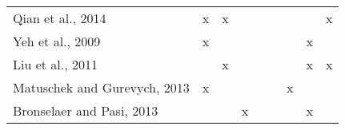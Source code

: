\begin{table}[]
\begin{tabular}{l|cccc|cccc}
Qian et al., 2014 \cite{2014.Tao.Qian.LexicalChainHypergraphWSI}                 & x                                  & x                                 &                                     &                                         &                                                                                  &                                        &                                                 & x                                                                                    \\
Yeh et al., 2009 \cite{2009.Yeh.Wikiwalk}                                        & x                                  &                                   &                                     &                                         &                                                                                  &                                        & x                                               &                                                                                      \\
Liu et al., 2011 \cite{2011.Haishan.AHypergraphbased}                            &                                    & x                                 &                                     &                                         &                                                                                  &                                        & x                                               & x                                                                                    \\
Matuschek and Gurevych, 2013 \cite{2013.Matuschek.Gurevych.Dijsktra.WSA}         & x                                  &                                   &                                     &                                         &                                                                                  & x                                      &                                                 &                                                                                      \\
Bronselaer and Pasi, 2013  \cite{2013.Bronselaer.TextAnalysisWithGraphs}         &                                    &                                   & x                                   &                                         &                                                                                  &                                        & x                                               &                                                                                      \\

\end{tabular}
\end{table}
